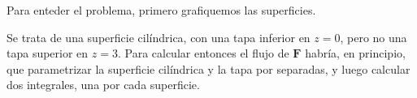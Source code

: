 \begin{solution}
    Para enteder el problema, primero grafiquemos las superficies.
    \begin{center}
    \end{center}
    Se trata de una superficie cilíndrica, con una tapa inferior en $z=0$, pero no una tapa superior en $z=3$.
    Para calcular entonces el flujo de $\boldsymbol{F}$ habría, en principio, que parametrizar la superficie cilíndrica y la
    tapa por separadas, y luego calcular dos integrales, una por cada superficie.


\end{solution}
